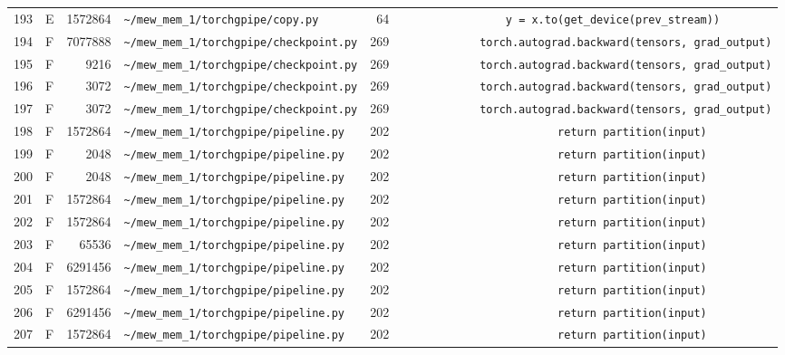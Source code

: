 \documentclass{article}
\begin{document}
\begin{longtable}{r l r p{6.5cm} r p{7.0cm}}
193 & E & 1572864 & \lstinline|~/mew_mem_1/torchgpipe/copy.py| & 64 & \lstinline|                y = x.to(get_device(prev_stream))| \\
194 & F & 7077888 & \lstinline|~/mew_mem_1/torchgpipe/checkpoint.py| & 269 & \lstinline|            torch.autograd.backward(tensors, grad_output)| \\
195 & F & 9216 & \lstinline|~/mew_mem_1/torchgpipe/checkpoint.py| & 269 & \lstinline|            torch.autograd.backward(tensors, grad_output)| \\
196 & F & 3072 & \lstinline|~/mew_mem_1/torchgpipe/checkpoint.py| & 269 & \lstinline|            torch.autograd.backward(tensors, grad_output)| \\
197 & F & 3072 & \lstinline|~/mew_mem_1/torchgpipe/checkpoint.py| & 269 & \lstinline|            torch.autograd.backward(tensors, grad_output)| \\
198 & F & 1572864 & \lstinline|~/mew_mem_1/torchgpipe/pipeline.py| & 202 & \lstinline|                        return partition(input)| \\
199 & F & 2048 & \lstinline|~/mew_mem_1/torchgpipe/pipeline.py| & 202 & \lstinline|                        return partition(input)| \\
200 & F & 2048 & \lstinline|~/mew_mem_1/torchgpipe/pipeline.py| & 202 & \lstinline|                        return partition(input)| \\
201 & F & 1572864 & \lstinline|~/mew_mem_1/torchgpipe/pipeline.py| & 202 & \lstinline|                        return partition(input)| \\
202 & F & 1572864 & \lstinline|~/mew_mem_1/torchgpipe/pipeline.py| & 202 & \lstinline|                        return partition(input)| \\
203 & F & 65536 & \lstinline|~/mew_mem_1/torchgpipe/pipeline.py| & 202 & \lstinline|                        return partition(input)| \\
204 & F & 6291456 & \lstinline|~/mew_mem_1/torchgpipe/pipeline.py| & 202 & \lstinline|                        return partition(input)| \\
205 & F & 1572864 & \lstinline|~/mew_mem_1/torchgpipe/pipeline.py| & 202 & \lstinline|                        return partition(input)| \\
206 & F & 6291456 & \lstinline|~/mew_mem_1/torchgpipe/pipeline.py| & 202 & \lstinline|                        return partition(input)| \\
207 & F & 1572864 & \lstinline|~/mew_mem_1/torchgpipe/pipeline.py| & 202 & \lstinline|                        return partition(input)| \\

\end{longtable}
\end{document}
